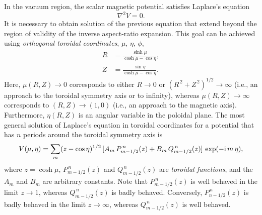 \documentclass[12pt,prb,aps]{revtex4-1}
\begin{document}
In the vacuum region, the scalar magnetic potential satisfies Laplace's equation
\begin{equation}
\nabla^2 V= 0.
\end{equation}
It is necessary to obtain solution of the previous equation that extend beyond the region of validity of the
inverse aspect-ratio expansion. This goal can be achieved using {\em orthogonal toroidal coordinates}, $\mu$, $\eta$, $\phi$,\,\cite{morse}
\begin{align}\label{e54cx}
R &= \frac{\sinh\mu}{\cosh\mu-\cos\eta},\\[0.5ex]
Z&= \frac{\sin\eta}{\cosh\mu-\cos\eta}.\label{e55cc}
\end{align}
Here, $\mu(R,Z)\rightarrow 0$ corresponds to either $R\rightarrow 0$ or $(R^{\,2}+Z^{\,2})^{1/2}\rightarrow\infty$ (i.e.,
an approach to the toroidal symmetry axis or to infinity), whereas $\mu(R,Z)\rightarrow \infty$
corresponds to $(R, Z) \rightarrow (1, 0)$ (i.e., an approach to the magnetic axis). Furthermore, $\eta(R,Z)$ is an angular variable in the poloidal
plane.  The most general solution of Laplace's equation in toroidal coordinates for a potential that has $n$ periods around the
toroidal symmetry axis is\,\cite{morse1}
\begin{equation}
V(\mu,\eta) = \sum_m (z-\cos\eta)^{1/2}\,[A_m\,P_{m-1/2}^{\,n}(z) + B_m\,Q_{m-1/2}^{\,n}(z)]\,\exp(-{\rm i}\,m\,\eta),\label{e233}
\end{equation}
where $z=\cosh\mu$, $P_{m-1/2}^{\,n}(z)$ and $Q_{m-1/2}^{\,n}(z)$ are {\em toroidal functions},\cite{abrama} and the $A_m$ and
$B_m$ are arbitrary constants.  Note that $P_{m-1/2}^{\,n}(z)$ is well behaved
in the limit $z\rightarrow 1$, whereas $Q_{m-1/2}^{\,n}(z)$ is badly behaved.  Conversely, $P_{n-1/2}^{\,n}(z)$ is badly behaved in the limit
$z\rightarrow\infty$, whereas $Q_{m-1/2}^{\,n}(z)$ is well behaved. 
\end{document}
